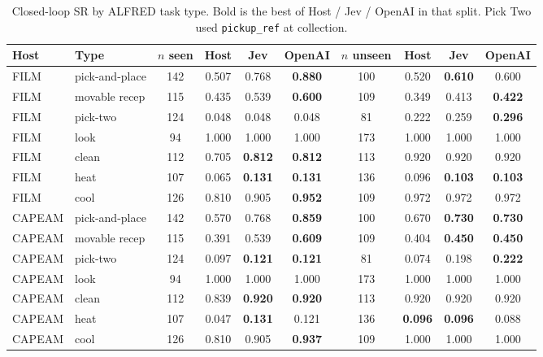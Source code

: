 \begin{table}[t]
\centering
\caption{Closed-loop SR by ALFRED task type. Bold is the best of Host / Jev / OpenAI in that split.
Pick Two used \texttt{pickup\_ref} at collection.}
\label{tab:task}
\scriptsize
\setlength{\tabcolsep}{3pt}
\begin{tabular}{llcccccccc}
\toprule
Host & Type & $n$ seen & Host & Jev & OpenAI & $n$ unseen & Host & Jev & OpenAI \\
\midrule
FILM & pick-and-place & 142 & 0.507 & 0.768 & \textbf{0.880} & 100 & 0.520 & \textbf{0.610} & 0.600 \\
FILM & movable recep & 115 & 0.435 & 0.539 & \textbf{0.600} & 109 & 0.349 & 0.413 & \textbf{0.422} \\
FILM & pick-two & 124 & 0.048 & 0.048 & 0.048 & 81 & 0.222 & 0.259 & \textbf{0.296} \\
FILM & look & 94 & 1.000 & 1.000 & 1.000 & 173 & 1.000 & 1.000 & 1.000 \\
FILM & clean & 112 & 0.705 & \textbf{0.812} & \textbf{0.812} & 113 & 0.920 & 0.920 & 0.920 \\
FILM & heat & 107 & 0.065 & \textbf{0.131} & \textbf{0.131} & 136 & 0.096 & \textbf{0.103} & \textbf{0.103} \\
FILM & cool & 126 & 0.810 & 0.905 & \textbf{0.952} & 109 & 0.972 & 0.972 & 0.972 \\
\midrule
CAPEAM & pick-and-place & 142 & 0.570 & 0.768 & \textbf{0.859} & 100 & 0.670 & \textbf{0.730} & \textbf{0.730} \\
CAPEAM & movable recep & 115 & 0.391 & 0.539 & \textbf{0.609} & 109 & 0.404 & \textbf{0.450} & \textbf{0.450} \\
CAPEAM & pick-two & 124 & 0.097 & \textbf{0.121} & \textbf{0.121} & 81 & 0.074 & 0.198 & \textbf{0.222} \\
CAPEAM & look & 94 & 1.000 & 1.000 & 1.000 & 173 & 1.000 & 1.000 & 1.000 \\
CAPEAM & clean & 112 & 0.839 & \textbf{0.920} & \textbf{0.920} & 113 & 0.920 & 0.920 & 0.920 \\
CAPEAM & heat & 107 & 0.047 & \textbf{0.131} & 0.121 & 136 & \textbf{0.096} & \textbf{0.096} & 0.088 \\
CAPEAM & cool & 126 & 0.810 & 0.905 & \textbf{0.937} & 109 & 1.000 & 1.000 & 1.000 \\
\bottomrule
\end{tabular}
\end{table}

